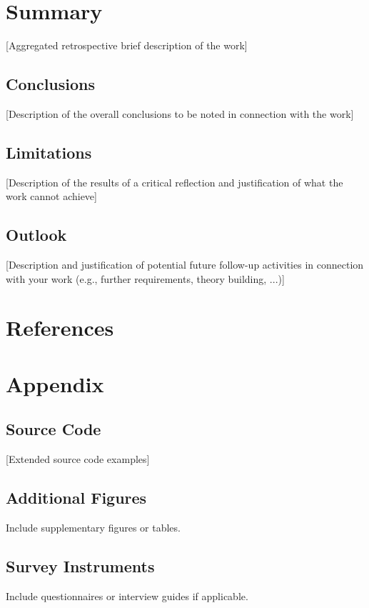 \documentclass[oneside,bibliography=totocnumbered,BCOR=5mm]{scrbook}
\begin{document}
\chapter{Summary}
[Aggregated retrospective brief description of the work]

\section{Conclusions}
[Description of the overall conclusions to be noted in connection with the work]

\section{Limitations}
[Description of the results of a critical reflection and justification of what the work cannot achieve]

\section{Outlook}
[Description and justification of potential future follow-up activities in connection with your work (e.g., further requirements, theory building, ...)]

\chapter*{References}
\printbibliography[heading=none,title={}]

\appendix
{}

\chapter{Appendix}

\section{Source Code}
[Extended source code examples]

\section{Additional Figures}
Include supplementary figures or tables.

\section{Survey Instruments}
Include questionnaires or interview guides if applicable.
\end{document}
